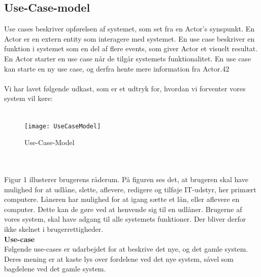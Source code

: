 \documentclass[a4paper]{article}
\begin{document}
\subsection{Use-Case-model}
Use cases beskriver opførelsen af systemet, som set fra en Actor’s synspunkt. En Actor er en extern entity som interagere med systemet. En use case beskriver en funktion i systemet som en del af flere events, som giver Actor et visuelt resultat. En Actor starter en use case når de tilgår systemets funktionalitet. En use case kan starte en ny use case, og derfra hente mere information fra Actor.\cite{OOSE}{42} \\ \\
Vi har lavet følgende udkast, som er et udtryk for, hvordan vi forventer vores system vil køre:\\ \\
\begin{figure}[h!]
\texttt{[image: UseCaseModel]}
  \caption{Use-Case-Model}
  \centering
\end{figure}  \\ \\
Figur 1 illusterer brugerens råderum. På figuren ses det, at brugeren skal have mulighed for at udlåne, slette, aflevere, redigere og tilføje IT-udstyr, her primært computere. Låneren har mulighed for at igang sætte et lån, eller aflevere en computer. Dette kan de gøre ved at henvende sig til en udlåner. Brugerne af vores system, skal have adgang til alle systemets funktioner. Der bliver derfor ikke skelnet i brugerrettigheder. \\
\textbf{Use-case}\\
Følgende use-cases er udarbejdet for at beskrive det nye, og det gamle system. Deres mening er at kaste lys over fordelene ved det nye system, såvel som bagdelene ved det gamle system. \\
\end{document}
